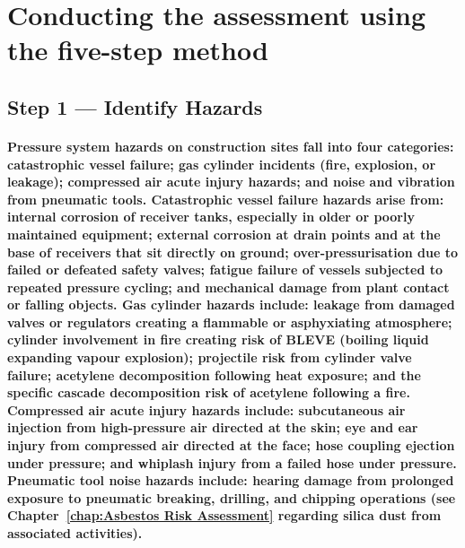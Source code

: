 \begin{itemize}
\end{itemize}

\section{Conducting the assessment using the five-step method}

\subsection{Step 1 --- Identify Hazards}
\paragraph{Pressure system hazards on construction sites fall into four categories: catastrophic vessel failure; gas cylinder incidents (fire, explosion, or leakage); compressed air acute injury hazards; and noise and vibration from pneumatic tools. Catastrophic vessel failure hazards arise from: internal corrosion of receiver tanks, especially in older or poorly maintained equipment; external corrosion at drain points and at the base of receivers that sit directly on ground; over-pressurisation due to failed or defeated safety valves; fatigue failure of vessels subjected to repeated pressure cycling; and mechanical damage from plant contact or falling objects. Gas cylinder hazards include: leakage from damaged valves or regulators creating a flammable or asphyxiating atmosphere; cylinder involvement in fire creating risk of BLEVE (boiling liquid expanding vapour explosion); projectile risk from cylinder valve failure; acetylene decomposition following heat exposure; and the specific cascade decomposition risk of acetylene following a fire. Compressed air acute injury hazards include: subcutaneous air injection from high-pressure air directed at the skin; eye and ear injury from compressed air directed at the face; hose coupling ejection under pressure; and whiplash injury from a failed hose under pressure. Pneumatic tool noise hazards include: hearing damage from prolonged exposure to pneumatic breaking, drilling, and chipping operations (see Chapter~\ref{chap:Asbestos Risk Assessment} regarding silica dust from associated activities).}


